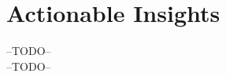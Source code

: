 \section*{Actionable Insights}
\begin{Form}
  \CheckBox[name=01]{} --TODO--\\
  \CheckBox[name=02]{} --TODO--\\
\end{Form}
